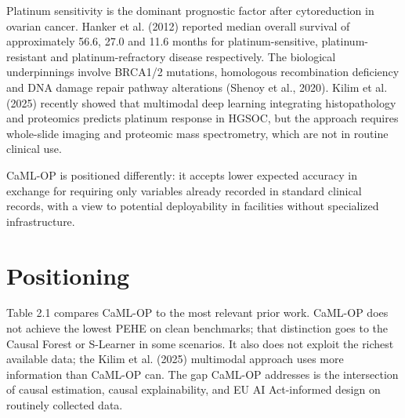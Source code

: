 Platinum sensitivity is the dominant prognostic factor after cytoreduction in ovarian cancer. Hanker et al. (2012) reported median overall survival of approximately 56.6, 27.0 and 11.6 months for platinum-sensitive, platinum-resistant and platinum-refractory disease respectively. The biological underpinnings involve BRCA1/2 mutations, homologous recombination deficiency and DNA damage repair pathway alterations (Shenoy et al., 2020). Kilim et al. (2025) recently showed that multimodal deep learning integrating histopathology and proteomics predicts platinum response in HGSOC, but the approach requires whole-slide imaging and proteomic mass spectrometry, which are not in routine clinical use.

CaML-OP is positioned differently: it accepts lower expected accuracy in exchange for requiring only variables already recorded in standard clinical records, with a view to potential deployability in facilities without specialized infrastructure.

\section{Positioning}\label{positioning}

Table 2.1 compares CaML-OP to the most relevant prior work. CaML-OP does not achieve the lowest PEHE on clean benchmarks; that distinction goes to the Causal Forest or S-Learner in some scenarios. It also does not exploit the richest available data; the Kilim et al. (2025) multimodal approach uses more information than CaML-OP can. The gap CaML-OP addresses is the intersection of causal estimation, causal explainability, and EU AI Act-informed design on routinely collected data.

